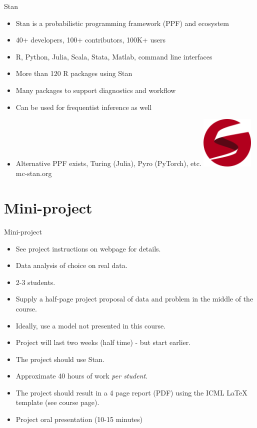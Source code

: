 \documentclass[10pt,handout]{beamer}
\begin{document}
\begin{frame}{Stan}

\begin{itemize}
  \item Stan is a probabilistic programming framework (PPF) and ecosystem
  \item 40+ developers, 100+ contributors, 100K+ users
  \item R, Python, Julia, Scala, Stata, Matlab, command line interfaces
  \item More than 120 R packages using Stan
  \item Many packages to support diagnostics and workflow
  \item Can be used for frequentist inference as well
  \item Alternative PPF exists, Turing (Julia), Pyro (PyTorch), etc.
  \center
  \vspace{\baselineskip}
  \includegraphics[width=2.5cm]{figs/stan_logo_wide.png}\\
  mc-stan.org
\end{itemize}

\end{frame}

\section{Mini-project}
\frame{\sectionpage}

\begin{frame}{Mini-project}

\begin{itemize}
\item See project instructions on webpage for details.
\item Data analysis of choice on real data.
\item 2-3 students.\pause
\item Supply a half-page project proposal of data and problem in the middle of the course.\pause
\item Ideally, use a model not presented in this course.
\item Project will last two weeks (half time) - but start earlier.
\item The project should use Stan.
\item Approximate 40 hours of work \emph{per student}.\pause
\item The project should result in a 4 page report (PDF) using the ICML LaTeX template (see course page).
\item Project oral presentation (10-15 minutes)
\end{itemize}
\end{frame}
\end{document}
